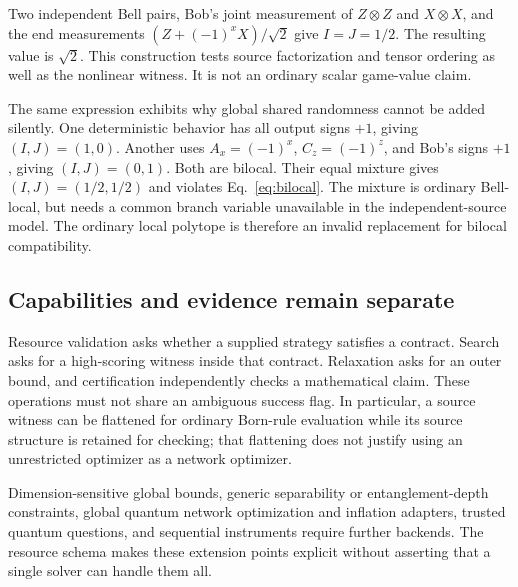 Two independent Bell pairs, Bob's joint measurement of $Z\otimes Z$ and
$X\otimes X$, and the end measurements
$(Z+(-1)^xX)/\sqrt2$ give $I=J=1/2$. The resulting value is $\sqrt2$.
This construction tests source factorization and tensor ordering as well as
the nonlinear witness. It is not an ordinary scalar game-value claim.

The same expression exhibits why global shared randomness cannot be added
silently. One deterministic behavior has all output signs $+1$, giving
$(I,J)=(1,0)$. Another uses $A_x=(-1)^x$, $C_z=(-1)^z$, and Bob's signs $+1$,
giving $(I,J)=(0,1)$. Both are bilocal. Their equal mixture gives
$(I,J)=(1/2,1/2)$ and violates Eq.~\eqref{eq:bilocal}. The mixture is
ordinary Bell-local, but needs a common branch variable unavailable in the
independent-source model. The ordinary local polytope is therefore an invalid
replacement for bilocal compatibility.

\subsection{Capabilities and evidence remain separate}
Resource validation asks whether a supplied strategy satisfies a contract.
Search asks for a high-scoring witness inside that contract. Relaxation asks
for an outer bound, and certification independently checks a mathematical
claim. These operations must not share an ambiguous success flag. In
particular, a source witness can be flattened for ordinary Born-rule
evaluation while its source structure is retained for checking; that
flattening does not justify using an unrestricted optimizer as a network
optimizer.

Dimension-sensitive global bounds, generic separability or entanglement-depth
constraints, global quantum network optimization and inflation adapters, trusted quantum
questions, and sequential instruments require further backends. The resource
schema makes these extension points explicit without asserting that a single
solver can handle them all.
